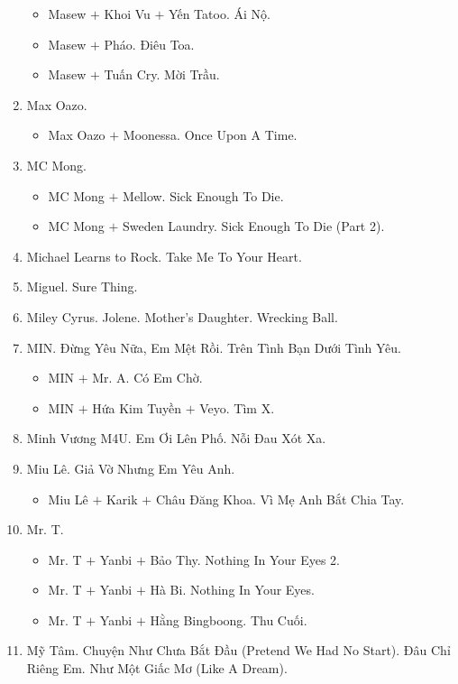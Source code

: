 \documentclass{article}
\begin{document}
\begin{enumerate}
\begin{itemize}
		\item {\sc Masew $+$ Khoi Vu $+$ Yến Tatoo.} Ái Nộ.
		\item {\sc Masew $+$ Pháo.} Điêu Toa.
		\item {\sc Masew $+$ Tuấn Cry.} Mời Trầu.
	\end{itemize}
	\item {\sc Max Oazo.}
	\begin{itemize}
		\item {\sc Max Oazo $+$ Moonessa.} Once Upon A Time.
	\end{itemize}
	\item {\sc MC Mong.}
	\begin{itemize}
		\item {\sc MC Mong $+$ Mellow.} Sick Enough To Die.
		\item {\sc MC Mong $+$ Sweden Laundry.} Sick Enough To Die (Part 2).
	\end{itemize}
	\item {\sc Michael Learns to Rock.} Take Me To Your Heart.
	\item {\sc Miguel.} Sure Thing.
	\item {\sc Miley Cyrus.} Jolene. Mother's Daughter. Wrecking Ball.
	\item {\sc MIN.} Đừng Yêu Nữa, Em Mệt Rồi. Trên Tình Bạn Dưới Tình Yêu.
	\begin{itemize}
		\item {\sc MIN $+$ Mr. A.} Có Em Chờ.
		\item {\sc MIN $+$ Hứa Kim Tuyền $+$ Veyo.} Tìm X.
	\end{itemize}
	\item {\sc Minh Vương M4U.} Em Ơi Lên Phố. Nỗi Đau Xót Xa.
	\item {\sc Miu Lê.} Giả Vờ Nhưng Em Yêu Anh.
	\begin{itemize}
		\item {\sc Miu Lê $+$ Karik $+$ Châu Đăng Khoa.} Vì Mẹ Anh Bắt Chia Tay.
	\end{itemize}
	\item {\sc Mr. T.}
	\begin{itemize}
		\item {\sc Mr. T $+$ Yanbi $+$ Bảo Thy.} Nothing In Your Eyes 2.
		\item {\sc Mr. T $+$ Yanbi $+$ Hà Bi.} Nothing In Your Eyes.
		\item {\sc Mr. T $+$ Yanbi $+$ Hằng Bingboong.} Thu Cuối.
	\end{itemize}
	\item {\sc Mỹ Tâm.} Chuyện Như Chưa Bắt Đầu (Pretend We Had No Start). Đâu Chỉ Riêng Em. Như Một Giấc Mơ (Like A Dream).

\end{enumerate}
\end{document}
